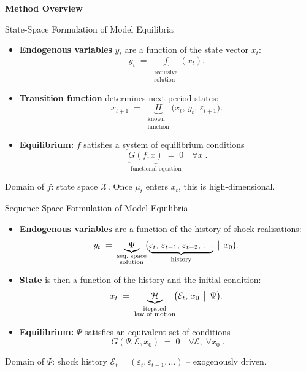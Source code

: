 \documentclass[aspectratio=169,11pt]{beamer}
\newcommand{\emphc}[1]{\textcolor{harvardcrimson}{#1}}
\newcommand{\histE}{\mathcal{E}}  %
\begin{document}

\begin{frame}{}
\centering\vspace{2.0cm}
{\Huge\color{uzhblue}\textbf{Method Overview}}
\end{frame}


\begin{frame}{State-Space Formulation of Model Equilibria}
\vspace{0.2em}
\begin{itemize}\itemsep10pt
\item \textbf{Endogenous variables} $y_t$ are a function of the state vector $x_t$:
\[
y_t \;=\; \underbrace{f}_{\substack{\text{recursive}\\ \text{solution}}}\!(x_t).
\]

\item \textbf{Transition function} determines next-period states:
\[
x_{t+1} \;=\; \underbrace{H}_{\substack{\text{known}\\ \text{function}}}\!\bigl(x_t,\, y_t,\, \varepsilon_{t+1}\bigr).
\]

\item \textbf{Equilibrium:} $f$ satisfies a system of equilibrium conditions
\[
\boxed{\;\underbrace{G(f, x) \;=\; 0}_{\text{functional equation}} \quad \forall x\;.}
\]
\end{itemize}
\vspace{0.2em}
{\footnotesize Domain of $f$: state space $\mathcal{X}$. Once $\mu_t$ enters $x_t$, this is high-dimensional.}
\end{frame}


\begin{frame}{Sequence-Space Formulation of Model Equilibria}
\vspace{0.2em}
\begin{itemize}\itemsep10pt
\item \textbf{Endogenous variables} are a function of the history of shock realisations:
\[
y_t \;=\; \underbrace{\Psi}_{\substack{\text{seq.\ space}\\ \text{solution}}}\!\bigl(\underbrace{\varepsilon_t,\,\varepsilon_{t-1},\,\varepsilon_{t-2},\,\ldots}_{\text{history}}\,\bigm|\, x_0\bigr).
\]

\item \textbf{State} is then a function of the history and the initial condition:
\[
x_t \;=\; \underbrace{\mathcal{H}}_{\substack{\text{iterated}\\ \text{law of motion}}}\!\bigl(\histE_t,\, x_0 \,\bigm|\, \Psi\bigr).
\]

\item \textbf{Equilibrium:} $\Psi$ satisfies an equivalent set of conditions
\[
\boxed{\;G(\Psi, \histE, x_0) \;=\; 0 \quad \forall \histE,\;\forall x_0\;.}
\]
\end{itemize}
\vspace{0.2em}
{\footnotesize Domain of $\Psi$: shock history $\histE_t = (\varepsilon_t, \varepsilon_{t-1}, \ldots)$ -- \emphc{exogenously driven}.}
\end{frame}
\end{document}
